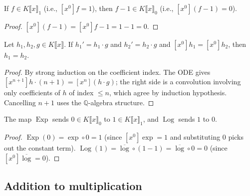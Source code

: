 \begin{lemma}
\label{lem.fps.sub-one-mem-PS0}
\leanhelper
\leanok
If $f \in K\llbracket x \rrbracket_1$ (i.e., $[x^0]f = 1$),
then $f - 1 \in K\llbracket x \rrbracket_0$ (i.e., $[x^0](f-1) = 0$).
\end{lemma}

\begin{proof}
\leanok
$[x^0](f - 1) = [x^0]f - 1 = 1 - 1 = 0$.
\end{proof}

\begin{lemma}[ODE uniqueness: $h' = h \cdot g$]
\label{lem.fps.ode-uniqueness-mul-self}
\leanhelper
\leanok
Let $h_1, h_2, g \in K\llbracket x \rrbracket$.
If $h_1' = h_1 \cdot g$ and $h_2' = h_2 \cdot g$
and $[x^0] h_1 = [x^0] h_2$, then $h_1 = h_2$.
\end{lemma}

\begin{proof}
By strong induction on the coefficient index. The ODE gives
$[x^{n+1}] h \cdot (n+1) = [x^n](h \cdot g)$; the right side is a
convolution involving only coefficients of $h$ of index $\le n$,
which agree by induction hypothesis. Cancelling $n+1$ uses the
$\mathbb{Q}$-algebra structure.
\end{proof}

\begin{lemma}[$\operatorname{Exp}(0) = 1$ and $\operatorname{Log}(1) = 0$]
\label{lem.fps.Exp-zero-Log-one}
\leanhelper
\leanok
The map $\operatorname{Exp}$ sends $0 \in K\llbracket x \rrbracket_0$
to $1 \in K\llbracket x \rrbracket_1$, and $\operatorname{Log}$
sends $1$ to $0$.
\end{lemma}

\begin{proof}
\leanok
$\operatorname{Exp}(0) = \exp \circ 0 = 1$ (since $[x^0]\exp = 1$ and
substituting $0$ picks out the constant term).
$\operatorname{Log}(1) = \overline{\log} \circ (1 - 1) = \overline{\log} \circ 0 = 0$
(since $[x^0]\overline{\log} = 0$).
\end{proof}

\subsection{Addition to multiplication}

